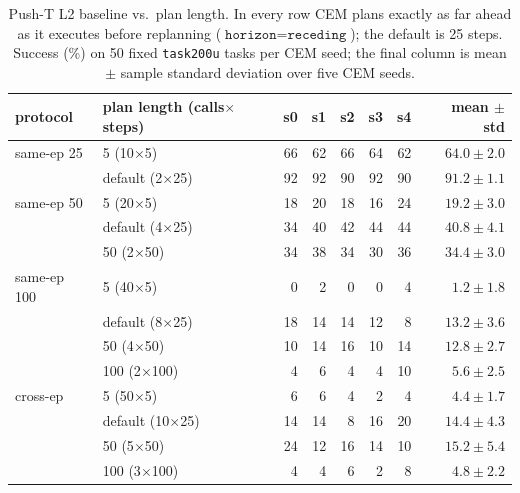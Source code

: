 \documentclass[11pt]{article}
\begin{document}
\begin{table}[t]
\centering
\small
\caption{Push-T L2 baseline vs.\ plan length. In every row CEM plans exactly as far ahead as it
executes before replanning ($\texttt{horizon}=\texttt{receding}$); the default is 25 steps.
Success (\%) on 50 fixed \texttt{task200u} tasks per CEM seed; the final column is mean $\pm$
sample standard deviation over five CEM seeds.}
\label{tab:replan-frequency}
\begin{tabular}{llrrrrrr}
\toprule
protocol & plan length (calls$\times$steps) & s0 & s1 & s2 & s3 & s4 & mean $\pm$ std \\
\midrule
same-ep 25  & 5 (10$\times$5)        & 66 & 62 & 66 & 64 & 62 & $64.0 \pm 2.0$ \\
            & default (2$\times$25)  & 92 & 92 & 90 & 92 & 90 & $91.2 \pm 1.1$ \\
\midrule
same-ep 50  & 5 (20$\times$5)        & 18 & 20 & 18 & 16 & 24 & $19.2 \pm 3.0$ \\
            & default (4$\times$25)  & 34 & 40 & 42 & 44 & 44 & $40.8 \pm 4.1$ \\
            & 50 (2$\times$50)       & 34 & 38 & 34 & 30 & 36 & $34.4 \pm 3.0$ \\
\midrule
same-ep 100 & 5 (40$\times$5)        & 0  & 2  & 0  & 0  & 4  & $1.2 \pm 1.8$ \\
            & default (8$\times$25)  & 18 & 14 & 14 & 12 & 8  & $13.2 \pm 3.6$ \\
            & 50 (4$\times$50)       & 10 & 14 & 16 & 10 & 14 & $12.8 \pm 2.7$ \\
            & 100 (2$\times$100)     & 4  & 6  & 4  & 4  & 10 & $5.6 \pm 2.5$ \\
\midrule
cross-ep    & 5 (50$\times$5)        & 6  & 6  & 4  & 2  & 4  & $4.4 \pm 1.7$ \\
            & default (10$\times$25) & 14 & 14 & 8  & 16 & 20 & $14.4 \pm 4.3$ \\
            & 50 (5$\times$50)       & 24 & 12 & 16 & 14 & 10 & $15.2 \pm 5.4$ \\
            & 100 (3$\times$100)     & 4  & 4  & 6  & 2  & 8  & $4.8 \pm 2.2$ \\
\bottomrule
\end{tabular}
\end{table}
\end{document}
